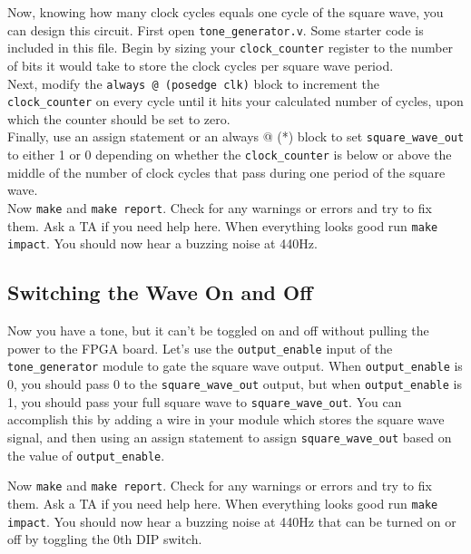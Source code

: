 \documentclass[11pt]{article}
\begin{document}
Now, knowing how many clock cycles equals one cycle of the square wave, you can design this circuit. First open \verb|tone_generator.v|. Some starter code is included in this file. Begin by sizing your \verb|clock_counter| register to the number of bits it would take to store the clock cycles per square wave period.\\

Next, modify the \verb|always @ (posedge clk)| block to increment the \verb|clock_counter| on every cycle until it hits your calculated number of cycles, upon which the counter should be set to zero.\\

Finally, use an assign statement or an always @ (*) block to set \verb|square_wave_out| to either 1 or 0 depending on whether the \verb|clock_counter| is below or above the middle of the number of clock cycles that pass during one period of the square wave.\\

Now \verb|make| and \verb|make report|. Check for any warnings or errors and try to fix them. Ask a TA if you need help here. When everything looks good run \verb|make impact|. You should now hear a buzzing noise at 440Hz.

\subsection{Switching the Wave On and Off}
Now you have a tone, but it can't be toggled on and off without pulling the power to the FPGA board. Let's use the \verb|output_enable| input of the \verb|tone_generator| module to gate the square wave output. When \verb|output_enable| is 0, you should pass 0 to the \verb|square_wave_out| output, but when \verb|output_enable| is 1, you should pass your full square wave to \verb|square_wave_out|. You can accomplish this by adding a wire in your module which stores the square wave signal, and then using an assign statement to assign \verb|square_wave_out| based on the value of \verb|output_enable|.

Now \verb|make| and \verb|make report|. Check for any warnings or errors and try to fix them. Ask a TA if you need help here. When everything looks good run \verb|make impact|. You should now hear a buzzing noise at 440Hz that can be turned on or off by toggling the 0th DIP switch.

\end{document}
